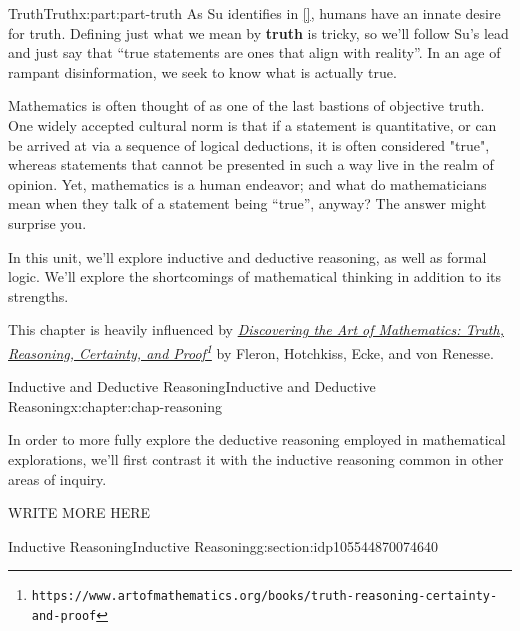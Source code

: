 \documentclass[oneside,10pt,]{book}
\newcommand{\xreffont}{\relax}
\newcommand{\terminology}[1]{\textbf{#1}}
\numberwithin{equation}{section}
\begin{document}
\begin{partptx}{Truth}{}{Truth}{}{}{x:part:part-truth}
 As Su identifies in \hyperlink{x:biblio:Su2020}{[{\xreffont 1}]}, humans have an innate desire for truth. Defining just what we mean by \terminology{truth} is tricky, so we'll follow Su's lead and just say that ``true statements are ones that align with reality''. In an age of rampant disinformation, we seek to know what is actually true.%
\par
Mathematics is often thought of as one of the last bastions of objective truth. One widely accepted cultural norm is that if a statement is quantitative, or can be arrived at via a sequence of logical deductions, it is often considered "true", whereas statements that cannot be presented in such a way live in the realm of opinion. Yet, mathematics is a human endeavor; and what do mathematicians mean when they talk of a statement being ``true'', anyway? The answer might surprise you.%
\par
In this unit, we'll explore inductive and deductive reasoning, as well as formal logic. We'll explore the shortcomings of mathematical thinking in addition to its strengths.%
\par
This chapter is heavily influenced by \emph{\href{https://www.artofmathematics.org/books/truth-reasoning-certainty-and-proof}{Discovering the Art of Mathematics: Truth, Reasoning, Certainty, and Proof}\footnote{\nolinkurl{https://www.artofmathematics.org/books/truth-reasoning-certainty-and-proof}\label{g:fn:idp105544870040592}}} by Fleron, Hotchkiss, Ecke, and von Renesse.%
%
\typeout{************************************************}
\typeout{************************************************}
%
\begin{chapterptx}{Inductive and Deductive Reasoning}{}{Inductive and Deductive Reasoning}{}{}{x:chapter:chap-reasoning}
\begin{introduction}{}%
In order to  more fully explore the deductive reasoning employed in mathematical explorations, we'll first contrast it with the inductive reasoning common in other areas of inquiry.%
\par
WRITE MORE HERE%
\end{introduction}%
%
%
\typeout{************************************************}
\typeout{************************************************}
%
\begin{sectionptx}{Inductive Reasoning}{}{Inductive Reasoning}{}{}{g:section:idp105544870074640}

\end{sectionptx}
\end{chapterptx}
\end{partptx}
\end{document}
